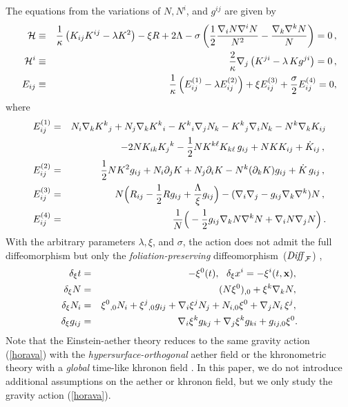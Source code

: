 \documentclass[preprint,aps,tightenlines,showkeys,nofootinbib,superscriptaddress]{revtex4}
\newcommand{\beq}{\begin{eqnarray}}
\newcommand{\eeq}{\end{eqnarray}}
\newcommand{\bea}{\begin{eqnarray*}}
\newcommand{\eea}{\end{eqnarray*}}
\newcommand{\eq}{eqnarray}
\newcommand{\ka}{\kappa}
\newcommand{\la}{{\lambda}}
\newcommand{\La}{{\Lambda}}
\newcommand{\si}{{\sigma}}
\newcommand{\pa}{{\partial}}
\newcommand{\no}{{\nonumber}}
\newcommand{\f}{\frac}
\newcommand{\diff}{diffeomorphism}
\begin{document}
The equations from the variations of $N, N^i$, and $g^{ij}$ are given by
\beq
{\cal H}&\equiv&\f{1}{\kappa}\left(K_{ij}K^{ij} -\lambda K^2\right)-\xi R +2 \La
-\si \left(\f{1}{2} \f{\nabla_i N \nabla^i N }{N^2} -\f{\nabla_k \nabla^k N }{N} \right) =0\, , \label{eom1} \\
{\cal H}^i&\equiv&\f{2}{\ka}\nabla_j \left(K^{ji}-\lambda\,Kg^{ji}\right)=0\, ,\label{eom2}\\
E_{ij}&\equiv&\frac{1}{\kappa}\left( E_{ij}^{(1)}-\lambda E_{ij}^{(2)} \right)
+\xi E_{ij}^{(3)}
+\frac{\si}{2}E_{ij}^{(4)}=0, \label{eom3}
\eeq
where
\bea
E_{ij}^{(1)}&=& N_i \nabla_k K^k{}_j + N_j\nabla_k K^k{}_i -K^k{}_i
\nabla_j N_k-
   K^k{}_j\nabla_i N_k - N^k\nabla_k K_{ij}\no\\
&& - 2N K_{ik} K_j{}^k
  -\frac{1}{2} N K^{k\ell} K_{k\ell}\, g_{ij} + N K K_{ij} + \dot K_{ij}
\,,\no \\
E_{ij}^{(2)}&=& \frac{1}{2} NK^2 g_{ij}+ N_i \pa_j K+
N_j \pa_i K- N^k (\pa_k K)g_{ij}+  \dot K\, g_{ij}\,,\no\\
E_{ij}^{(3)}&=&N\Big(R_{ij}- \frac{1}{2}R g_{ij}+\frac{\La}{\xi}g_{ij}\Big)-(
\nabla_i\nabla_j-g_{ij}\nabla_k\nabla^k)N\,,\no\\
E_{ij}^{(4)}&=&\f{1}{N} \Big(-\f{1}{2} g_{ij} \nabla_k N \nabla^k N+ \nabla_i N \nabla_j N\Big)\,.
\eea
With the arbitrary parameters $\la, \xi$, and $\si$, the action does not admit the full diffeomorphism but only the {\it foliation-preserving} \diff~(${\it Diff}_{\cal F}$) \cite{Hora:2009,Park:2009},
\begin{\eq}
\delta_{\xi} t&=&-{\xi}^{0}(t),~~ \delta_{\xi} x^{i}=-\xi^{i}(t,{\bf x}), \no %
\\
\delta_{\xi} N&=&(N{\xi}^{0})_{,0}+\xi^{k}\nabla_{k}N, \no %
\\
\delta_{\xi}{N_{i}}&=&{\xi}^{0}{}_{,0}N_{i}+\xi^{j}{}_{,0}g_{ij}+\nabla_{i}\xi^{j}N_{j}
+N_{i,0}{\xi}^{0}+\nabla_{j}N_{i}\,\xi^{j}, \no %
\\
\delta_{\xi}{g_{ij}}&=&\nabla_{i}\xi^{k}g_{kj}+\nabla_{j}\xi^{k}g_{ki}
+g_{ij,0}{\xi}^{0}.
\label{delg3}
\end{\eq}
Note that the Einstein-aether theory reduces to the same gravity action (\ref{horava}) with the {\it hypersurface-orthogonal} aether field \cite{Jaco:2013} or the khronometric theory with a {\it global} time-like khronon field \cite{Blas:2011}. In this paper, we do not introduce additional assumptions on the aether or khronon field, but we only study the gravity action (\ref{horava}).
\end{document}
